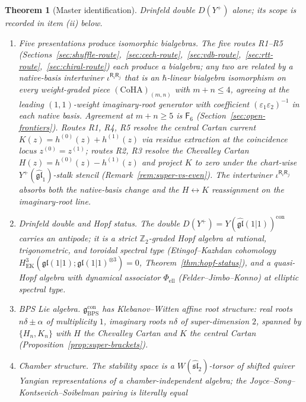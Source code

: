 \documentclass[11pt]{amsart}
\newtheorem{theorem}{Theorem}[section]
\theoremstyle{definition}
\providecommand{\CoHA}{\mathrm{CoHA}}
\providecommand{\Z}{\mathbb{Z}}
\providecommand{\fgl}{\mathfrak{gl}}
\providecommand{\fsl}{\mathfrak{sl}}
\providecommand{\fg}{\mathfrak{g}}
\begin{document}
\begin{theorem}[Master identification]
Drinfeld double $D(Y^{+})$ alone; its scope is recorded in item (ii)
below.
\begin{enumerate}[label=\emph{(\roman*)}, leftmargin=2em]
\item \emph{Five presentations produce isomorphic bialgebras.}
  The five routes R1--R5
  (Sections~\ref{sec:shuffle-route},~\ref{sec:cech-route},~\ref{sec:vdb-route},~\ref{sec:rtt-route},~\ref{sec:chiral-route})
  each produce a bialgebra; any two are related by a native-basis
  intertwiner $\iota^{\mathsf R_{i}\mathsf R_{j}}$ that is an
  $\hbar$-linear bialgebra isomorphism on every weight-graded piece
  $(\CoHA)_{(m,n)}$ with $m+n\leq 4$, agreeing at the leading
  $(1,1)$-weight imaginary-root generator with coefficient
  $(\varepsilon_{1}\varepsilon_{2})^{-1}$ in each native basis.
  Agreement at $m+n\geq 5$ is $\mathsf F_{6}$
  (Section~\ref{sec:open-frontiers}). Routes R1, R4, R5 resolve the
  central Cartan current $K(z) = h^{(0)}(z) + h^{(1)}(z)$ via
  residue extraction at the coincidence locus
  $z^{(0)} = z^{(1)}$; routes R2, R3 resolve the Chevalley Cartan
  $H(z) = h^{(0)}(z) - h^{(1)}(z)$ and project $K$ to zero under the
  chart-wise $Y^{+}(\widehat{\fgl}_{1})$-stalk stencil
  (Remark~\ref{rem:super-vs-even}). The intertwiner
  $\iota^{\mathsf R_{i}\mathsf R_{j}}$ absorbs both the
  native-basis change and the $H\leftrightarrow K$ reassignment on
  the imaginary-root line.
\item \emph{Drinfeld double and Hopf status.} The double
  $D(Y^{+}) = Y(\widehat{\fgl}(1|1))^{\mathrm{con}}$ carries an
  antipode; it is a \emph{strict $\Z_{2}$-graded Hopf algebra} at
  rational, trigonometric, and toroidal spectral type (Etingof--Kazhdan
  cohomology $H^{3}_{\mathrm{EK}}(\fgl(1|1);\fgl(1|1)^{\otimes 3}) = 0$,
  Theorem~\ref{thm:hopf-status}), and a \emph{quasi-Hopf algebra with
  dynamical associator} $\Phi_{\mathrm{ell}}$
  (Felder--Jimbo--Konno) at elliptic spectral type.
\item \emph{BPS Lie algebra.} $\fg_{\mathrm{BPS}}^{\mathrm{con}}$ has
  Klebanov--Witten affine root structure: real roots
  $n\delta\pm\alpha$ of multiplicity $1$, imaginary roots $n\delta$ of
  super-dimension $2$, spanned by $\{H_{n}, K_{n}\}$ with $H$ the
  Chevalley Cartan and $K$ the central Cartan
  (Proposition~\ref{prop:super-brackets}).
\item \emph{Chamber structure.} The stability space is a
  $W(\widehat{\fsl}_{2})$-torsor of shifted quiver Yangian
  representations of a chamber-independent algebra; the
  Joyce--Song--Kontsevich--Soibelman pairing is literally equal

\end{enumerate}
\end{theorem}
\end{document}
